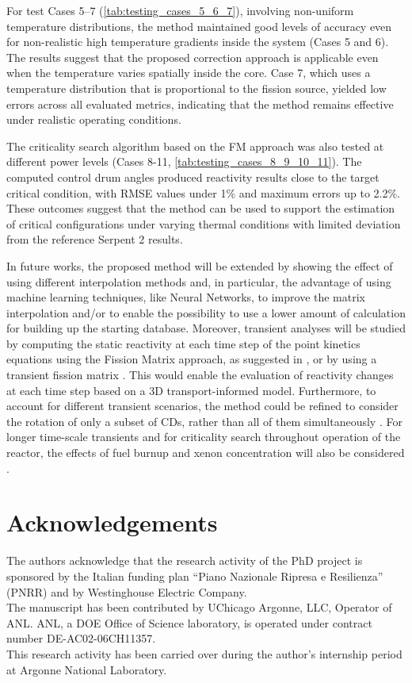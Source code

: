 \documentclass[preprint,review,12pt]{elsarticle}
\begin{document}
For test Cases 5--7 (\cref{tab:testing_cases_5_6_7}), involving non-uniform temperature distributions, the method maintained good levels of accuracy even for non-realistic high temperature gradients inside the system (Cases 5 and 6). The results suggest that the proposed correction approach is applicable even when the temperature varies spatially inside the core. Case 7, which uses a temperature distribution that is proportional to the fission source, yielded low errors across all evaluated metrics, indicating that the method remains effective under realistic operating conditions.

The criticality search algorithm based on the FM approach was also tested at different power levels (Cases 8-11, \cref{tab:testing_cases_8_9_10_11}). The computed control drum angles produced reactivity results close to the target critical condition, with RMSE values under 1\% and maximum errors up to 2.2\%. These outcomes suggest that the method can be used to support the estimation of critical configurations under varying thermal conditions with limited deviation from the reference Serpent 2 results. 

In future works, the proposed method will be extended by showing the effect of using different interpolation methods and, in particular, the advantage of using machine learning techniques, like Neural Networks, to improve the matrix interpolation and/or to enable the possibility to use a lower amount of calculation for building up the starting database. 
Moreover, transient analyses will be studied by computing the static reactivity at each time step of the point kinetics equations using the Fission Matrix approach, as suggested in \cite{Dalinger2024}, or by using a transient fission matrix \cite{Mascolino2024}. This would enable the evaluation of reactivity changes at each time step based on a 3D transport-informed model. Furthermore, to account for different transient scenarios, the method could be refined to consider the rotation of only a subset of CDs, rather than all of them simultaneously \cite{Mascolino2022}. For longer time-scale transients and for criticality search throughout operation of the reactor, the effects of fuel burnup and xenon concentration will also be considered \cite{Roskoff2018,Pungercic}.

\section*{Acknowledgements}
The authors acknowledge that the research activity of the PhD project is sponsored by the Italian funding plan ``Piano Nazionale Ripresa e Resilienza'' (PNRR) and by Westinghouse Electric Company. \\ The manuscript has been contributed by UChicago Argonne, LLC, Operator of ANL. ANL, a DOE Office of Science laboratory, is operated under contract number DE-AC02-06CH11357. \\
This research activity has been carried over during the author’s internship period at Argonne National Laboratory.
 

\end{document}
